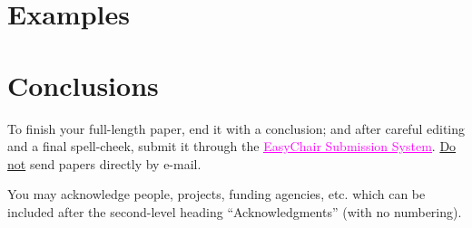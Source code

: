 \documentclass{article}
\newenvironment{INScode}		{\vspace{-2mm}\small\verbatim}{\endverbatim\vspace{-2mm}}
\begin{document}
\section{Examples}

\section{Conclusions}
To finish your full-length paper, end it with a conclusion;
and after careful editing and a final spell-cheek,
submit it through the \href{https://easychair.org/conferences/?conf=tenor2016}{\textcolor {magenta} {\underline {EasyChair Submission System}}}. 
\underline{Do not} send papers directly by e-mail.
%
\begin{acknowledgments}
You may acknowledge people, projects, 
funding agencies, etc. 
which can be included after the second-level heading
``Acknowledgments'' (with no numbering).
\end{acknowledgments} 



%               
%      
\end{document}
